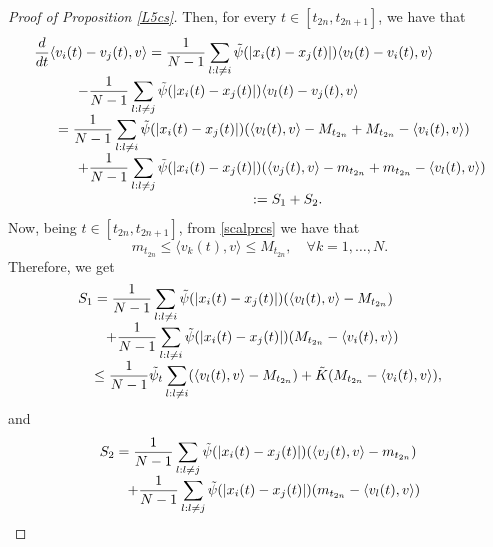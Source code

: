 \documentclass[a4paper,11pt,oneside]{article}
\begin{document}
\begin{proof}[Proof of Proposition \ref{L5cs}]
	Then, for every  $t\in [t_{2n},t_{2n+1}]$, we have that 
	$$
	\begin{array}{l}
		\displaystyle{
			\frac{d}{dt}\langle v_{i}(t)-v_{j}(t),v\rangle=\frac{1}{N-1}\sum_{l:l\neq i}\tilde \psi(\lvert x_{i}(t)-x_{j}(t)\rvert)\langle v_{l}(t)-v_{i}(t),v\rangle}\\
		\displaystyle{\hspace{1.1cm}-\frac{1}{N-1}\sum_{l:l\neq j}\tilde\psi(\lvert x_{i}(t)-x_{j}(t)\rvert)\langle v_{l}(t)-v_{j}(t),v\rangle}\\
		\displaystyle{\hspace{0.6cm}=\frac{1}{N-1}\sum_{l:l\neq i}\tilde\psi(\lvert x_{i}(t)-x_{j}(t)\rvert)(\langle v_{l}(t),v\rangle-M_{t_{2n}}+M_{t_{2n}}-\langle v_{i}(t),v\rangle)}\\
		\displaystyle{\hspace{1.1cm}+\frac{1}{N-1}\sum_{l:l\neq j}\tilde\psi(\lvert x_{i}(t)-x_{j}(t)\rvert)(\langle v_{j}(t),v\rangle-m_{t_{2n}}+m_{t_{2n}}-\langle v_{l}(t),v\rangle)}\\
		\displaystyle{\hspace{5.5 cm}:=S_1+S_2.}
	\end{array}
	$$
	Now, being $t\in [t_{2n},t_{2n+1}]$,  from \eqref{scalprcs} we have that
	\begin{equation}\label{7cs}
		m_{t_{2n}}\leq\langle v_{k}(t),v\rangle\leq M_{t_{2n}}, \quad\forall k=1,\dots,N.
	\end{equation}
	Therefore, we get
	$$
	\begin{array}{l}
		\displaystyle{
			S_1=\frac{1}{N-1}\sum_{l:l\neq i}\tilde\psi(\lvert x_{i}(t)-x_{j}(t)\rvert)(\langle v_{l}(t),v\rangle-M_{t_{2n}})}\\
		\displaystyle{\hspace{0.7 cm}+\frac{1}{N-1}\sum_{l:l\neq i}\tilde\psi(\lvert x_{i}(t)-x_{j}(t)\rvert)(M_{t_{2n}}-\langle v_{i}(t),v\rangle)}\\
		\displaystyle{\hspace{0.4 cm}\leq \frac{1}{N-1}\tilde\psi_{t}\sum_{l:l\neq i}(\langle v_{l}(t),v\rangle-M_{t_{2n}})+\tilde K(M_{t_{2n}}-\langle v_{i}(t),v\rangle)},
	\end{array}
	$$
	and	
	$$
	\begin{array}{l}
		\displaystyle{
			S_2=\frac{1}{N-1}\sum_{l:l\neq j}\tilde\psi(\lvert x_{i}(t)-x_{j}(t)\rvert)(\langle v_{j}(t),v\rangle-m_{t_{2n}})}\\
		\displaystyle{\hspace{0.7 cm}+\frac{1}{N-1}\sum_{l:l\neq j}\tilde\psi(\lvert x_{i}(t)-x_{j}(t)\rvert)(m_{t_{2n}}-\langle v_{l}(t),v\rangle)}\\

\end{array}$$
\end{proof}
\end{document}
